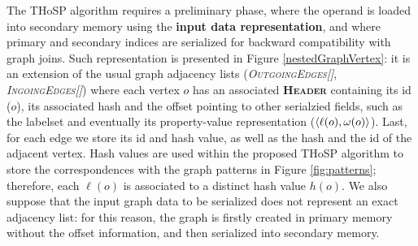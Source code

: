 
The THoSP algorithm requires a preliminary phase, where the operand is loaded into secondary memory using the \textbf{input data  representation}, and where primary and secondary indices are serialized for backward compatibility with graph joins. Such representation is presented in Figure \ref{nestedGraphVertex}: it is an extension of the usual graph adjacency lists (\textit{\textsc{OutgoingEdges[]}}, \textit{\textsc{IngoingEdges[]}}) where each vertex $o$ has an associated \textbf{\textsc{Header}} containing its id ($o$), its associated hash and the offset pointing to other serialzied fields, such as the labelset and eventually its property-value representation ($\Braket{\ell(o),\omega(o)}$). Last, for each edge we store its id and hash value, as well as the hash and the id of the adjacent vertex. Hash values are used within the proposed THoSP algorithm to store the correspondences with the graph patterns in Figure \ref{fig:patterns}; therefore, each $\ell(o)$ is associated to a distinct hash value  $h(o)$. We also suppose that the input graph data to be serialized does not represent an exact adjacency list: for this reason, the graph is firstly created in primary memory without the offset information, and then serialized into secondary memory. 

